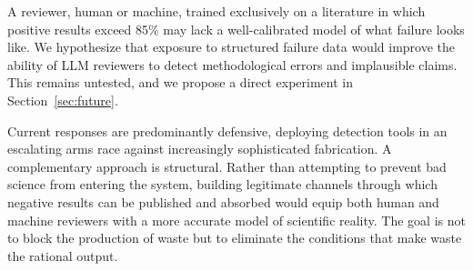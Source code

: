 A reviewer, human or machine, trained exclusively on a literature
in which positive results exceed 85\%
\citep{fanelli2012negative} may lack a well-calibrated model of
what failure looks like. We hypothesize that exposure to structured
failure data would improve the ability of LLM reviewers to detect
methodological errors and implausible claims. This remains
untested, and we propose a direct experiment in
Section~\ref{sec:future}.

Current responses are predominantly defensive, deploying detection
tools in an escalating arms race against increasingly sophisticated
fabrication. A complementary approach is structural. Rather than
attempting to prevent bad science from entering the system, building
legitimate channels through which negative results can be published
and absorbed would equip both human and machine reviewers with a
more accurate model of scientific reality. The goal is not to block
the production of waste but to eliminate the conditions that make
waste the rational output.